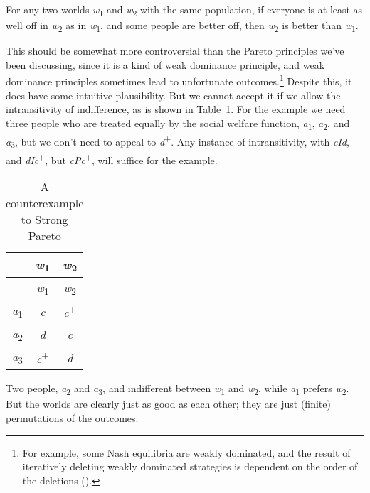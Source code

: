 \documentclass[
  11pt,
  letterpaper,
  DIV=11,
  numbers=noendperiod,
  twoside]{scrartcl}
\providecommand{\tightlist}{%
  \setlength{\itemsep}{0pt}\setlength{\parskip}{0pt}}
\begin{document}
\begin{description}
\tightlist
\item[Strong Pareto]
For any two worlds \emph{w}\textsubscript{1} and
\emph{w}\textsubscript{2} with the same population, if everyone is at
least as well off in \emph{w}\textsubscript{2} as in
\emph{w}\textsubscript{1}, and some people are better off, then
\emph{w}\textsubscript{2} is better than \emph{w}\textsubscript{1}.
\end{description}

This should be somewhat more controversial than the Pareto principles
we've been discussing, since it is a kind of weak dominance principle,
and weak dominance principles sometimes lead to unfortunate
outcomes.\footnote{For example, some Nash equilibria are weakly
  dominated, and the result of iteratively deleting weakly dominated
  strategies is dependent on the order of the deletions
  ().} Despite
this, it does have some intuitive plausibility. But we cannot accept it
if we allow the intransitivity of indifference, as is shown in
Table~\ref{tbl-strong-pareto}. For the example we need three people who
are treated equally by the social welfare function,
\emph{a}\textsubscript{1}, \emph{a}\textsubscript{2}, and
\emph{a}\textsubscript{3}, but we don't need to appeal to
\emph{d}\textsuperscript{+}. Any instance of intransitivity, with
\emph{cId}, and \emph{dIc}\textsuperscript{+}, but
\emph{cPc}\textsuperscript{+}, will suffice for the example.

\begin{longtable}[]{@{}ccc@{}}
\caption{A counterexample to Strong
Pareto}\label{tbl-strong-pareto}\tabularnewline
\toprule\noalign{}
& \emph{w}\textsubscript{1} & \emph{w}\textsubscript{2} \\
\midrule\noalign{}
\endfirsthead
\toprule\noalign{}
& \emph{w}\textsubscript{1} & \emph{w}\textsubscript{2} \\
\midrule\noalign{}
\endhead
\bottomrule\noalign{}
\endlastfoot
\emph{a}\textsubscript{1} & \emph{c} & \emph{c}\textsuperscript{+} \\
\emph{a}\textsubscript{2} & \emph{d} & \emph{c} \\
\emph{a}\textsubscript{3} & \emph{c}\textsuperscript{+} & \emph{d} \\
\end{longtable}

Two people, \emph{a}\textsubscript{2} and \emph{a}\textsubscript{3}, and
indifferent between \emph{w}\textsubscript{1} and
\emph{w}\textsubscript{2}, while \emph{a}\textsubscript{1} prefers
\emph{w}\textsubscript{2}. But the worlds are clearly just as good as
each other; they are just (finite) permutations of the outcomes.
\end{document}

